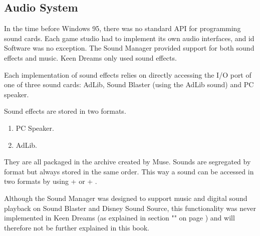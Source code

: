 \documentclass[book.tex]{subfiles}
\begin{document}
\par
\begin{minipage}{\textwidth}
  
\end{minipage}
\label{time_ticks}


\subsection{Audio System}
In the time before Windows 95, there was no standard API for programming sound cards. Each game studio had to implement its own audio interfaces, and id Software was no exception. The Sound Manager provided support for both sound effects and music. Keen Dreams only used sound effects.\\

\par
\begin{minipage}{\textwidth}

\end{minipage}

\par
Each implementation of sound effects relies on directly accessing the I/O port of one of three sound cards: AdLib, Sound Blaster (using the AdLib sound) and PC speaker. \\

\par
Sound effects are stored in two formats.
\begin{enumerate}
\item PC Speaker.
\item AdLib.
\end{enumerate}

They are all packaged in the  archive created by Muse. Sounds are segregated by format but always stored in the same order. This way a sound can be accessed in two formats by using  +  or  + .\\



\begin{minipage}{\textwidth}

\end{minipage}

\par
Although the Sound Manager was designed to support music and digital sound playback on Sound Blaster and Disney Sound Source, this functionality was never implemented in Keen Dreams (as explained in section "" on page \pageref{section:audio}) and will therefore not be further explained in this book.\\
\end{document}
